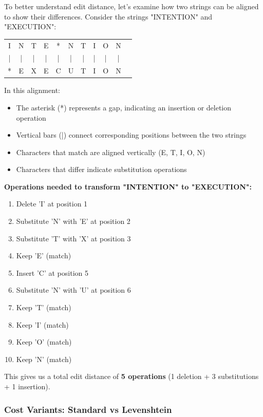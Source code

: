 \documentclass[11pt,a4paper]{article}
\theoremstyle{definition}
\theoremstyle{plain}
\theoremstyle{remark}
\begin{document}
To better understand edit distance, let's examine how two strings can be aligned to show their differences. Consider the strings "INTENTION" and "EXECUTION":

\begin{center}
\begin{tabular}{ccccccccccc}
I & N & T & E & * & N & T & I & O & N \\
| & | & | & | & | & | & | & | & | & | \\
* & E & X & E & C & U & T & I & O & N \\
\end{tabular}
\end{center}

In this alignment:
\begin{itemize}
    \item The asterisk (*) represents a gap, indicating an insertion or deletion operation
    \item Vertical bars (|) connect corresponding positions between the two strings
    \item Characters that match are aligned vertically (E, T, I, O, N)
    \item Characters that differ indicate substitution operations
\end{itemize}

\textbf{Operations needed to transform "INTENTION" to "EXECUTION":}
\begin{enumerate}
    \item Delete 'I' at position 1
    \item Substitute 'N' with 'E' at position 2
    \item Substitute 'T' with 'X' at position 3
    \item Keep 'E' (match)
    \item Insert 'C' at position 5
    \item Substitute 'N' with 'U' at position 6
    \item Keep 'T' (match)
    \item Keep 'I' (match)
    \item Keep 'O' (match)
    \item Keep 'N' (match)
\end{enumerate}

This gives us a total edit distance of \textbf{5 operations} (1 deletion + 3 substitutions + 1 insertion).

\subsubsection{Cost Variants: Standard vs Levenshtein}
\end{document}
